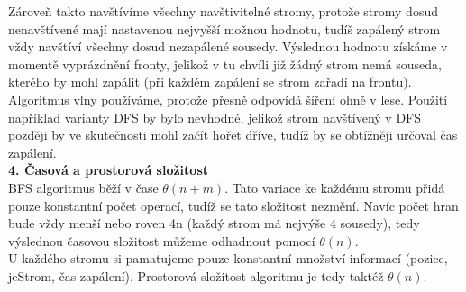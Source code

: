 \documentclass[11pt,a4paper]{report}
\begin{document}
Zároveň takto navštívíme všechny navštivitelné stromy, protože stromy dosud nenavštívené mají nastavenou nejvyšší možnou hodnotu, tudíš zapálený strom vždy navštíví všechny dosud nezapálené sousedy. Výslednou hodnotu získáme v momentě vyprázdnění fronty, jelikož v tu chvíli již žádný strom nemá souseda, kterého by mohl zapálit (při každém zapálení se strom zařadí na frontu). \\
 
Algoritmus vlny používáme, protože přesně odpovídá šíření ohně v lese. Použití například varianty DFS by bylo nevhodné, jelikož strom navštívený v DFS později by ve skutečnosti mohl začít hořet dříve, tudíž by se obtížněji určoval čas zapálení.\\

\textbf{4. Časová a prostorová složitost}\\

BFS algoritmus běží v čase $\theta (n+m)$. Tato variace ke každému stromu přidá pouze konstantní počet operací, tudíž se tato složitost nezmění. Navíc počet hran bude vždy menší nebo roven 4n (každý strom má nejvýše 4 sousedy), tedy výslednou časovou složitost můžeme odhadnout pomocí $\theta (n)$.\\
U každého stromu si pamatujeme pouze konstantní množství informací (pozice, jeStrom, čas zapálení). Prostorová složitost algoritmu je tedy taktéž $\theta (n)$. 
\end{document}
